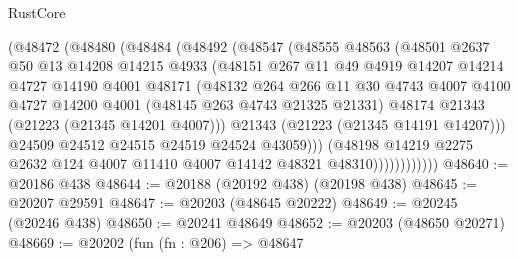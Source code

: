 \begin{lexlean}{RustCore}
\begin{coremodule}
                  (@48472
                    (@48480
                      (@48484
                        (@48492
                          (@48547
                            (@48555
                              @48563
                              (@48501
                                @2637
                                @50
                                @13
                                @14208
                                @14215
                                @4933
                                (@48151
                                  @267
                                  @11
                                  @49
                                  @4919
                                  @14207
                                  @14214
                                  @4727
                                  @14190
                                  @4001
                                  @48171
                                  (@48132
                                    @264
                                    @266
                                    @11
                                    @30
                                    @4743
                                    @4007
                                    @4100
                                    @4727
                                    @14200
                                    @4001
                                    (@48145 @263 @4743 @21325 @21331)
                                    @48174
                                    @21343
                                    (@21223 (@21345 @14201 @4007)))
                                  @21343
                                  (@21223 (@21345 @14191 @14207)))
                                @24509
                                @24512
                                @24515
                                @24519
                                @24524
                                @43059)))
                          (@48198
                            @14219
                            @2275
                            @2632
                            @124
                            @4007
                            @11410
                            @4007
                            @14142
                            @48321
                            @48310))))))))))))
@48640 := @20186 @438
@48644 := @20188 (@20192 @438) (@20198 @438)
@48645 := @20207 @29591
@48647 := @20203 (@48645 @20222)
@48649 := @20245 (@20246 @438)
@48650 := @20241 @48649
@48652 := @20203 (@48650 @20271)
@48669 := @20202
    (fun (fn : @206) =>
    @48647

\end{coremodule}
\end{lexlean}
